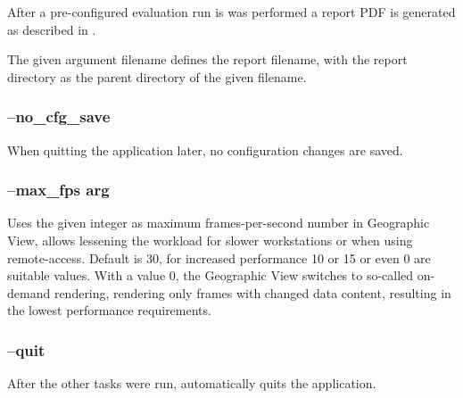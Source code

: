 After a pre-configured evaluation run is was performed a report PDF is generated as described in .

The given argument filename defines the report filename, with the report directory as the parent directory of the given filename.

\subsubsection{--no\_cfg\_save}

When quitting the application later, no configuration changes are saved.

\subsubsection{--max\_fps arg}

Uses the given integer as maximum frames-per-second number in Geographic View, allows lessening the workload for slower workstations or when using remote-access. Default is 30, for increased performance 10 or 15 or even 0 are suitable values. With a value 0, the Geographic View switches to so-called on-demand rendering, rendering only frames with changed data content, resulting in the lowest performance requirements.

\subsubsection{--quit}

After the other tasks were run, automatically quits the application.


